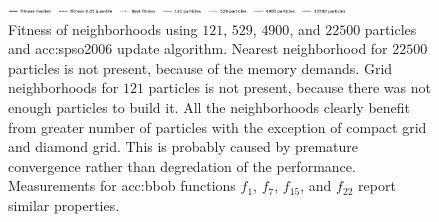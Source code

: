 \begin{figure}[ht!]
    \begin{minipage}{\textwidth}
        \centering
        \includegraphics[width=0.8\textwidth]{img/runs/fitness_pso_neigh_legend.pdf}
    \end{minipage}

    \caption[Fitness of PSO neighborhoods]{Fitness of neighborhoods using $121$, $529$, $4900$, and $22500$ particles and \acrshort{acc:spso2006} update algorithm. Nearest neighborhood for $22500$ particles is not present, because of the memory demands. Grid neighborhoods for $121$ particles is not present, because there was not enough particles to build it. 
    All the neighborhoods clearly benefit from greater number of particles with the exception of compact grid and diamond grid. This is probably caused by premature convergence rather than degredation of the performance.
    Measurements for \acrshort{acc:bbob} functions $f_1$, $f_7$, $f_{15}$, and $f_{22}$ report similar properties.}
\end{figure}




